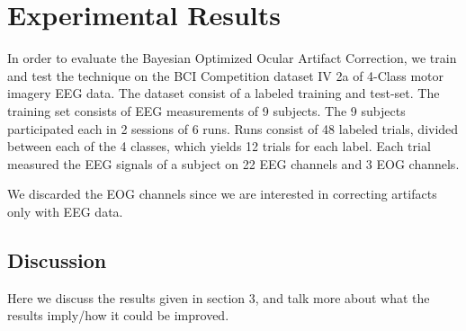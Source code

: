 \section{Experimental Results}
In order to evaluate the Bayesian Optimized Ocular Artifact Correction, we train and test the technique on the BCI Competition dataset IV 2a of 4-Class motor imagery EEG data.
The dataset consist of a labeled training and test-set. The training set consists of EEG measurements of 9 subjects. The 9 subjects participated each in 2 sessions of 6 runs. Runs consist of 48 labeled trials, divided between each of the 4 classes, which yields 12 trials for each label. Each trial measured the EEG signals of a subject on 22 EEG channels and 3 EOG channels. 

We discarded the EOG channels since we are interested in correcting artifacts only with EEG data. 

\subsection{Discussion}
Here we discuss the results given in section 3, and talk more about what the results imply/how it could be improved.